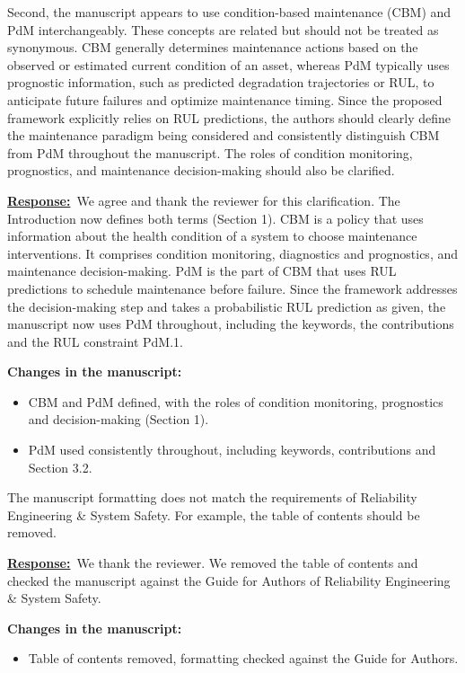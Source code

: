 \documentclass{article}
\newcommand{\response}{\vspace{0.1cm}\noindent\underline{\textbf{Response:}}\ }
\newcommand{\changes}{\vspace{0.1cm}\noindent\textbf{Changes in the manuscript:}}
\begin{document}
\begin{cmt}{}{}
Second, the manuscript appears to use condition-based maintenance (CBM) and PdM interchangeably. These concepts are related but should not be treated as synonymous. CBM generally determines maintenance actions based on the observed or estimated current condition of an asset, whereas PdM typically uses prognostic information, such as predicted degradation trajectories or RUL, to anticipate future failures and optimize maintenance timing. Since the proposed framework explicitly relies on RUL predictions, the authors should clearly define the maintenance paradigm being considered and consistently distinguish CBM from PdM throughout the manuscript. The roles of condition monitoring, prognostics, and maintenance decision-making should also be clarified.
\end{cmt}

\response We agree and thank the reviewer for this clarification. The Introduction now defines both terms (Section 1). CBM is a policy that uses information about the health condition of a system to choose maintenance interventions. It comprises condition monitoring, diagnostics and prognostics, and maintenance decision-making. PdM is the part of CBM that uses RUL predictions to schedule maintenance before failure. Since the framework addresses the decision-making step and takes a probabilistic RUL prediction as given, the manuscript now uses PdM throughout, including the keywords, the contributions and the RUL constraint PdM.1.

\changes
\begin{itemize}[nosep]
\item CBM and PdM defined, with the roles of condition monitoring, prognostics and decision-making (Section 1).
\item PdM used consistently throughout, including keywords, contributions and Section 3.2.
\end{itemize}

\begin{cmt}{}{}
The manuscript formatting does not match the requirements of Reliability Engineering \& System Safety. For example, the table of contents should be removed.
\end{cmt}

\response We thank the reviewer. We removed the table of contents and checked the manuscript against the Guide for Authors of Reliability Engineering \& System Safety.

\changes
\begin{itemize}[nosep]
\item Table of contents removed, formatting checked against the Guide for Authors.
\end{itemize}
\end{document}
